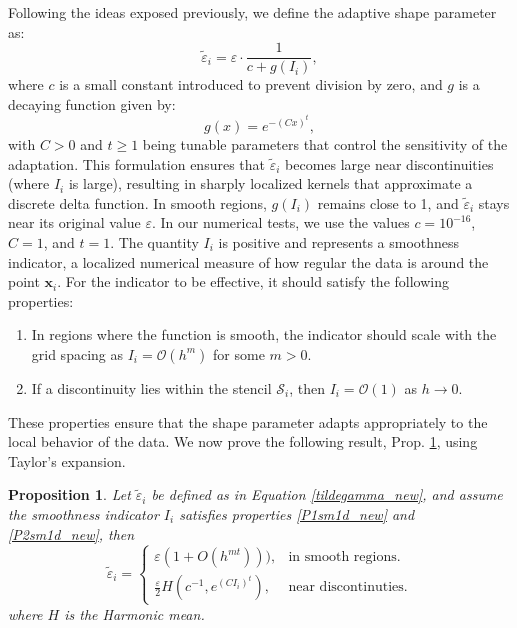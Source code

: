\documentclass[preprint]{elsarticle}       %
\newtheorem{proposition}[theorem]{Proposition}
\begin{document}
Following the ideas exposed previously, we define the adaptive shape parameter as:
\begin{equation}\label{tildegamma_new}
\tilde{\varepsilon}_i = \varepsilon \cdot \frac{1}{c + g(I_i)},
\end{equation}
where $c$ is a small constant introduced to prevent division by zero, and $g$ is a decaying function given by:
\begin{equation}\label{gx}
g(x) = e^{- (C x)^t},
\end{equation}
with $C > 0$ and $t \ge 1$ being tunable parameters that control the sensitivity of the adaptation. This formulation ensures that $\tilde{\varepsilon}_i$ becomes large near discontinuities (where $I_i$ is large), resulting in sharply localized kernels that approximate a discrete delta function. In smooth regions, $g(I_i)$ remains close to 1, and $\tilde{\varepsilon}_i$ stays near its original value $\varepsilon$.
In our numerical tests, we use the values $c = 10^{-16}$, $C = 1$, and $t = 1$. The quantity $I_i$ is positive and represents a smoothness indicator, a localized numerical measure of how regular the data is around the point $\mathbf{x}_i$. For the indicator to be effective, it should satisfy the following properties:
\begin{enumerate}[label={\bfseries P\arabic*}]
\item\label{P1sm1d_new} In regions where the function is smooth, the indicator should scale with the grid spacing as $I_i = \mathcal{O}(h^m)$ for some $m > 0$.
\item\label{P2sm1d_new} If a discontinuity lies within the stencil $\mathcal{S}_i$, then $I_i = \mathcal{O}(1)$ as $h \to 0$.
\end{enumerate}
These properties ensure that the shape parameter adapts appropriately to the local behavior of the data.
We now prove the following result, Prop. \ref{prop1},  using Taylor's expansion. 
\begin{proposition}\label{prop1}
Let $\tilde{\varepsilon}_i$ be defined as in Equation \eqref{tildegamma_new}, and assume the smoothness indicator $I_i$ satisfies properties \ref{P1sm1d_new} and \ref{P2sm1d_new}, then
$$
\tilde{\varepsilon}_i=\begin{cases}
\varepsilon(1+O(h^{mt}))),& \text{in smooth regions.}\\
\frac\varepsilon2 H(c^{-1},e^{(CI_i)^t}), & \text{near discontinuties}.
\end{cases}
$$
where $H$ is the Harmonic mean. 
\end{proposition}
\end{document}
